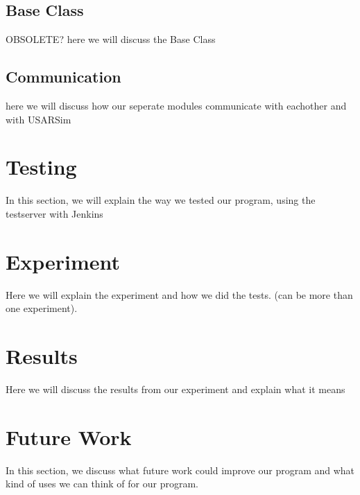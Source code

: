 \documentclass[a4paper,10pt]{article}
\begin{document}
\subsection{Base Class}
OBSOLETE? here we will discuss the Base Class

\subsection{Communication}
here we will discuss how our seperate modules communicate with eachother and with USARSim

\section{Testing}
In this section, we will explain the way we tested our program, using the testserver with Jenkins

\section{Experiment}
Here we will explain the experiment and how we did the tests. (can be more than one experiment).

\section{Results}
Here we will discuss the results from our experiment and explain what it means

\section{Future Work}
In this section, we discuss what future work could improve our program and what kind of uses we can think of for our program.
\end{document}
